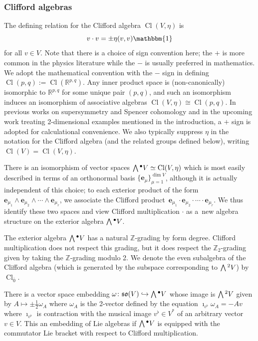 \documentclass[10pt,a4paper]{amsart}
\numberwithin{equation}{section}
\newcommand{\fso}{\mathfrak{so}}
\newcommand{\RR}{\mathbb{R}}
\newcommand{\ZZ}{\mathbb{Z}}
\newcommand{\Wedge}{\mathchoice{{\textstyle\bigwedge}}{\bigwedge}{\bigwedge}{\bigwedge}}	%
\newcommand{\be}{\boldsymbol{e}}
\newcommand{\1}{\mathbbm{1}}
\DeclareMathOperator{\Cl}{Cl}
\begin{document}
\subsubsection{Clifford algebras}
\label{sec:clifford-algs}

The defining relation for the Clifford algebra $\Cl(V,\eta)$ is
\begin{equation}\label{eq:clifford-rel}
	v\cdot v = \pm\eta(v,v)\1
\end{equation}
for all $v\in V$. Note that there is a choice of sign convention here; the $+$ is more common in the physics literature while the $-$ is usually preferred in mathematics. We adopt the mathematical convention with the $-$ sign in defining $\Cl(p,q):=\Cl(\RR^{p,q})$. Any inner product space is (non-canonically) isomorphic to $\RR^{p,q}$ for some unique pair $(p,q)$, and such an isomorphism induces an isomorphism of associative algebras $\Cl(V,\eta)\cong \Cl(p,q)$. In previous works on supersymmetry and Spencer cohomology \cite{Beckett2021,deMedeiros2016,deMedeiros2018,Figueroa-OFarrill2017} and in the upcoming work treating 2-dimensional examples mentioned in the introduction, a $+$ sign is adopted for calculational convenience. We also typically suppress $\eta$ in the notation for the Clifford algebra (and the related groups defined below), writing $\Cl(V)=\Cl(V,\eta)$.

There is an isomorphism of vector spaces $\Wedge^\bullet V\simeq \Cl(V,\eta)$ which is most easily described in terms of an orthonormal basis $\{\be_\mu\}_{\mu=1}^{\dim V}$, although it is actually independent of this choice; to each exterior product of the form $\be_{\mu_1}\wedge\be_{\mu_2}\wedge\cdots\wedge\be_{\mu_r}$, we associate the Clifford product~${\be_{\mu_1}\cdot\be_{\mu_2}\cdot\cdots\cdot\be_{\mu_r}}$. We thus identify these two spaces and view Clifford multiplication $\cdot$ as a~new algebra structure on the exterior algebra $\Wedge^\bullet V$.

The exterior algebra $\Wedge^\bullet V$ has a natural $\ZZ$-grading by form degree. Clifford multiplication does not respect this grading, but it does respect the $\ZZ_2$-grading given by taking the $\ZZ$-grading modulo 2. We denote the even subalgebra of the Clifford algebra \big(which is generated by the subspace corresponding to $\Wedge^2 V$\big) by $\Cl_{\overline0}$.

There is a vector space embedding $\omega\colon\fso(V)\hookrightarrow\Wedge^\bullet V$ whose image is $\Wedge^2 V$ given by $A\mapsto \pm\frac{1}{2}\omega_A$ where $\omega_A$ is the 2-vector defined by the equation
$\imath_{v^\flat}\omega_A = -Av
$
where $\imath_{v^\flat}$ is contraction with the musical image $v^\flat\in V^*$ of an arbitrary vector $v\in V$.
This an embedding of Lie algebras if $\Wedge^\bullet V$ is equipped with the commutator Lie bracket with respect to Clifford multiplication.
\end{document}
